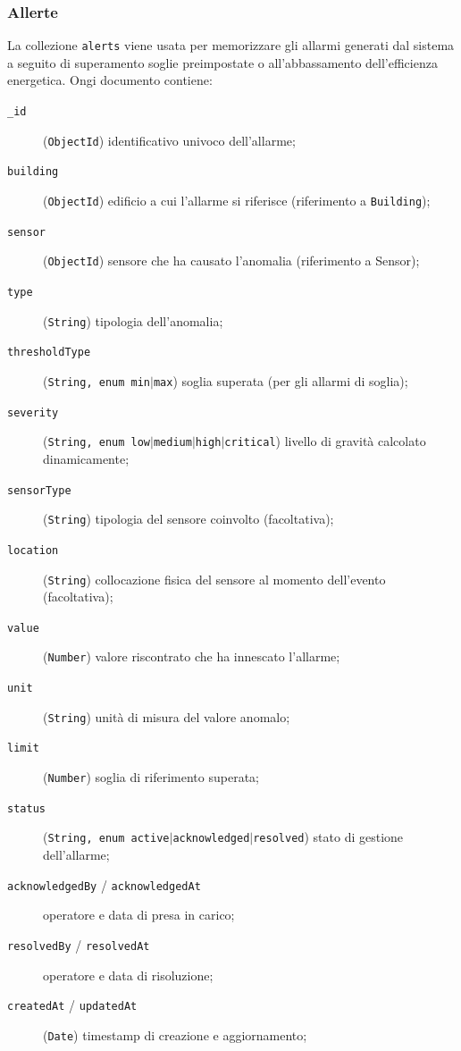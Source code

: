     \subsubsection{Allerte}
        La collezione \texttt{alerts} viene usata per memorizzare gli allarmi
        generati dal sistema a seguito di superamento soglie preimpostate o all'abbassamento dell'efficienza energetica. Ongi documento contiene:
        \begin{description}
            \item[\texttt{\_id}] (\texttt{ObjectId}) identificativo univoco dell'allarme;
            \item[\texttt{building}] (\texttt{ObjectId}) edificio a cui l'allarme si riferisce (riferimento a \texttt{Building});
            \item[\texttt{sensor}] (\texttt{ObjectId}) sensore che ha causato l'anomalia (riferimento a Sensor);
            \item[\texttt{type}] (\texttt{String}) tipologia dell'anomalia;
            \item[\texttt{thresholdType}] (\texttt{String, enum \texttt{min}$|$\texttt{max}}) soglia superata (per gli allarmi di soglia);
            \item[\texttt{severity}] (\texttt{String, enum \texttt{low}$|$\texttt{medium}$|$\texttt{high}$|$\texttt{critical}}) livello di gravità calcolato dinamicamente;
            \item[\texttt{sensorType}] (\texttt{String}) tipologia del sensore coinvolto (facoltativa);
            \item[\texttt{location}] (\texttt{String}) collocazione fisica del sensore al momento dell'evento (facoltativa);
            \item[\texttt{value}] (\texttt{Number}) valore riscontrato che ha innescato l'allarme;
            \item[\texttt{unit}] (\texttt{String}) unità di misura del valore anomalo;
            \item[\texttt{limit}] (\texttt{Number}) soglia di riferimento superata;
            \item[\texttt{status}] (\texttt{String, enum \texttt{active}$|$\texttt{acknowledged}$|$\texttt{resolved}}) stato di gestione dell'allarme;
            \item[\texttt{acknowledgedBy} / \texttt{acknowledgedAt}] operatore e data di presa in carico;
            \item[\texttt{resolvedBy} / \texttt{resolvedAt}] operatore e data di risoluzione;
            \item[\texttt{createdAt} / \texttt{updatedAt}] (\texttt{Date}) timestamp di creazione e aggiornamento;
        \end{description}
